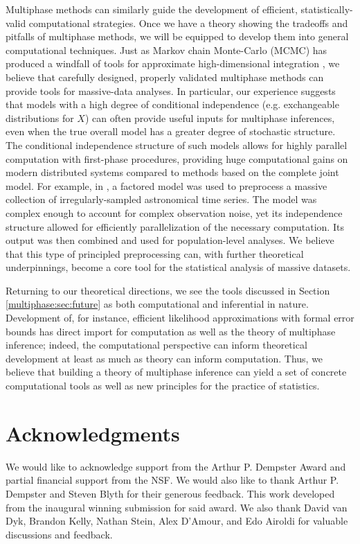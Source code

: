 Multiphase methods can similarly guide the development of efficient, statistically-valid computational strategies.
Once we have a theory showing the tradeoffs and pitfalls of multiphase methods, we will be equipped to develop them into general computational techniques.
Just as Markov chain Monte-Carlo (MCMC) has produced a windfall of tools for approximate high-dimensional integration \citep[see][for many examples]{Brooks2010}, we believe that carefully designed, properly validated multiphase methods can provide tools for massive-data analyses.
In particular, our experience suggests that models with a high degree of conditional independence (e.g. exchangeable distributions for $X$) can often provide useful inputs for multiphase inferences, even when the true overall model has a greater degree of stochastic structure.
The conditional independence structure of such models allows for highly parallel computation with first-phase procedures, providing huge computational gains on modern distributed systems compared to methods based on the complete joint model.
For example, in \citet{Blocker2012}, a factored model was used to preprocess a massive collection of irregularly-sampled astronomical time series.
The model was complex enough to account for complex observation noise, yet its independence structure allowed for efficiently parallelization of the necessary computation.
Its output was then combined and used for population-level analyses.
We believe that this type of principled preprocessing can, with further theoretical underpinnings, become a core tool for the statistical analysis of massive datasets.

Returning to our theoretical directions, we see the tools discussed in Section \ref{multiphase:sec:future} as both computational and inferential in nature.
Development of, for instance, efficient likelihood approximations with formal error bounds has direct import for computation as well as the theory of multiphase inference; indeed, the computational perspective can inform theoretical development at least as much as theory can inform computation.
Thus, we believe that building a theory of multiphase inference can yield a set of concrete computational tools as well as new principles for the practice of statistics.

\section*{Acknowledgments}
We would like to acknowledge support from the Arthur P. Dempster Award and partial financial support from the NSF.
We would also like to thank Arthur P. Dempster and Steven Blyth for their generous feedback.
This work developed from the inaugural winning submission for said award.
We also thank David van Dyk, Brandon Kelly, Nathan Stein, Alex D'Amour, and Edo Airoldi for valuable discussions and feedback.

